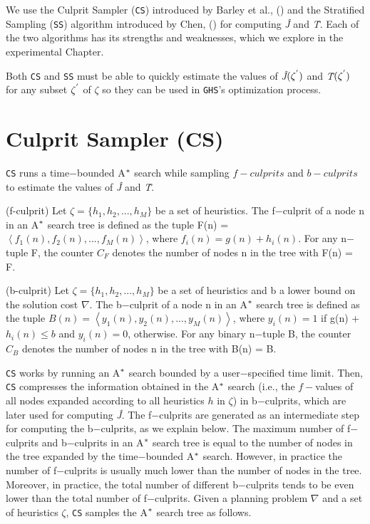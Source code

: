 We use the Culprit Sampler (\texttt{CS}) introduced by Barley et al., (\citeyear{BarleySantiagoOver}) and the Stratified Sampling (\texttt{SS}) algorithm introduced by Chen, (\citeyear{chen1992heuristic}) for computing \textit{\^{J}} and \textit{\^{T}}. Each of the two algorithms has its strengths and weaknesses, which we explore in the experimental Chapter.

Both \texttt{CS} and \texttt{SS} must be able to quickly estimate the values of \textit{\^{J}}$(\zeta\sp{'})$ and \textit{\^{T}}$(\zeta\sp{'})$ for any subset $\zeta\sp{'}$ of $\zeta$ so they can be used in \texttt{GHS}'s optimization process.

\section{Culprit Sampler (CS)}
\noindent
\texttt{CS} runs a time$-$bounded A$\sp{*}$ search while sampling $f-culprits$ and $b-culprits$ to estimate the values of \textit{\^{J}} and \textit{\^{T}}.

\begin{definition}(f-culprit)
Let $\zeta = \{h_{1}, h_{2},...,h_{M}\}$ be a set of heuristics. The f$-$culprit of a node n in an A$\sp{*}$ search tree is defined as the tuple F(n) = $\left\langle f_{1}(n), f_{2}(n),...,f_{M}(n)  \right\rangle$, where $f_{i}(n) = g(n)+h_{i}(n)$. For any n$-$tuple F, the counter $C_{F}$ denotes the number of nodes n in the tree with F(n) = F.
\label{def:def_fculprits}
\end{definition}

\begin{definition}(b-culprit)
Let $\zeta = \{h_{1}, h_{2},...,h_{M}\}$ be a set of heuristics and b a lower bound on the solution cost $\nabla$. The b$-$culprit of a node n in an A$\sp{*}$ search tree is defined as the tuple $B(n) = \left\langle y_{1}(n), y_{2}(n),...,y_{M}(n)\right\rangle$, where $y_{i}(n) = 1$ if g(n) + $h_{i}(n) \leq b$ and $y_{i}(n) = 0$, otherwise.  For any binary n$-$tuple B, the counter $C_{B}$ denotes the number of nodes n in the tree with B(n) = B.
\label{def:def_bculprits}
\end{definition}

\texttt{CS} works by running an A$\sp{*}$ search bounded by a user$-$specified time limit. Then, \texttt{CS} compresses the information obtained in the A$\sp{*}$ search (\textsf{i.e.,} the $f-$values of all nodes expanded according to all heuristics $h$ in $\zeta$) in b$-$culprits, which are later used for computing \textit{\^{J}}. The f$-$culprits are generated as an intermediate step for computing the b$-$culprits, as we explain below. The maximum number of f$-$culprits and b$-$culprits in an A$\sp{*}$ search tree is equal to the number of nodes in the tree expanded by the time$-$bounded A$\sp{*}$ search. However, in practice the number of f$-$culprits is usually much lower than the number of nodes in the tree. Moreover, in practice, the total number of different b$-$culprits tends to be even lower than the total number of f$-$culprits. Given a planning problem $\nabla$ and a set of heuristics $\zeta$, \texttt{CS} samples the A$\sp{*}$ search tree as follows.


